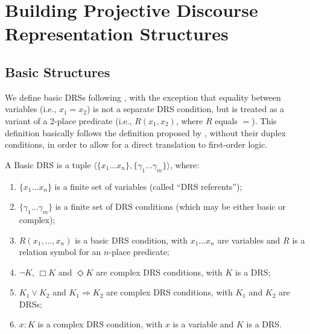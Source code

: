 \section{Building Projective Discourse Representation Structures}


\subsection{Basic Structures}

We define basic DRSs following , with the
exception that equality between variables (i.e., $x_1=x_2$) is not
a separate DRS condition, but is treated as a variant of a 2-place predicate
(i.e., $R(x_1,x_2)$, where $R$ equals $=$). This definition basically
follows the definition proposed by , without
their duplex conditions, in order to allow for a direct translation to
first-order logic.

\begin{definition} \label{def:bDRS}
 A Basic DRS is a tuple $\langle \{x_1 ... x_n\},\{\gamma_1 ... \gamma_m\} 
 \rangle$, where:
 \begin{enumerate}[i]
  \item $\{x_1 ... x_n\}$ is a finite set of variables (called ``DRS
    referents'');
  \item $\{\gamma_1 ... \gamma_m\}$ is a finite set of DRS conditions (which
    may be either basic or complex);
  \item\label{def:bDRS:Rel} $R(x_1, ..., x_n)$ is a basic DRS condition,
    with $x_1 ... x_n$ are variables and $R$ is a relation symbol for an
    $n$-place predicate;
  \item $\neg K$, $\Box K$ and $\Diamond K$ are complex DRS conditions, with
    $K$ is a DRS;
  \item $K_1 \vee K_2$ and $K_1 \Rightarrow K_2$ are complex DRS conditions,
    with $K_1$ and $K_2$ are DRSs;
  \item \label{def:bDRS:Prop} $x:K$ is a complex DRS condition, with $x$ is
    a variable and $K$ is a DRS.
 \end{enumerate} 
\end{definition}


